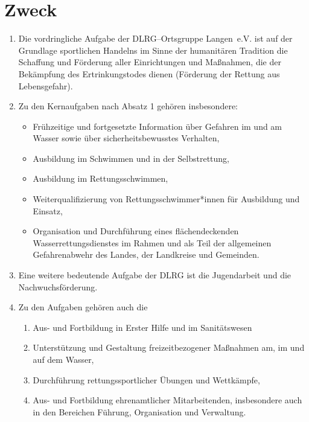 \documentclass[%
12pt, %
a4paper, %
headsepline, %
parskip, %
headings=normal, %
]{scrreprt}
\begin{document}
\section{Zweck}
\label{sec:zweck}
\begin{enumerate}
    \item Die vordringliche Aufgabe der DLRG--Ortsgruppe Langen~e.V. ist auf der Grundlage sportlichen Handelns im Sinne der humanitären Tradition die Schaffung und Förderung aller Einrichtungen und Maßnahmen, die der Bekämpfung des Ertrinkungstodes dienen (Förderung der Rettung aus Lebensgefahr).
    \item Zu den Kernaufgaben nach Absatz 1 gehören insbesondere:\begin{itemize}
        \item Frühzeitige und fortgesetzte Information über Gefahren im und am Wasser sowie über sicherheitsbewusstes Verhalten,
        \item Ausbildung im Schwimmen und in der Selbstrettung,
        \item Ausbildung im Rettungsschwimmen,
        \item Weiterqualifizierung von Rettungsschwimmer*innen für Ausbildung und Einsatz,
        \item Organisation und Durchführung eines flächendeckenden Wasserrettungsdienstes im Rahmen und als Teil der allgemeinen Gefahrenabwehr des Landes, der Landkreise und Gemeinden.
      \end{itemize}
    \item Eine weitere bedeutende Aufgabe der DLRG ist die Jugendarbeit und die Nachwuchsförderung.
    \item Zu den Aufgaben gehören auch die \begin{enumerate}[noitemsep]
        \item Aus- und Fortbildung in Erster Hilfe und im Sanitätswesen
        \item Unterstützung und Gestaltung freizeitbezogener Maßnahmen am, im und auf dem Wasser,
        \item Durchführung rettungssportlicher Übungen und Wettkämpfe,
        \item Aus- und Fortbildung ehrenamtlicher Mitarbeitenden, insbesondere auch in den Bereichen Führung, Organisation und Verwaltung.
      \end{enumerate}

\end{enumerate}
\end{document}
